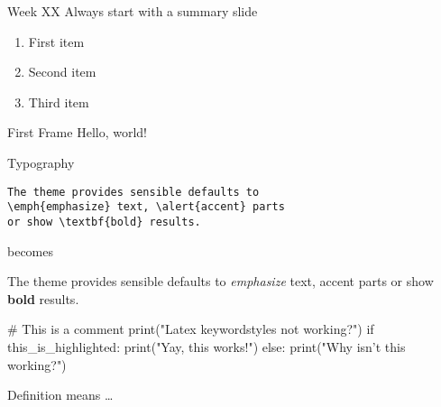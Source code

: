 \documentclass[aspectratio=169]{beamer}
\newcommand{\weekNumber}{XX}
\begin{document}
\maketitle

\begin{frame}{Week \weekNumber}
  Always start with a summary slide
  \begin{enumerate}
  \item First item
  \item Second item
  \item Third item
  \end{enumerate}
  \end{frame}

\begin{frame}{First Frame}
    Hello, world!
  \end{frame}

  \begin{frame}[fragile]{Typography}
      \begin{verbatim}The theme provides sensible defaults to
\emph{emphasize} text, \alert{accent} parts
or show \textbf{bold} results.\end{verbatim}

  \begin{center}becomes\end{center}

  The theme provides sensible defaults to \emph{emphasize} text,
  \alert{accent} parts or show \textbf{bold} results.
\end{frame}

  \begin{frame}[fragile]

  \begin{python}[caption={My\_Caption.py},firstnumber=10]
# This is a comment
print("Latex keywordstyles not working?")
if this_is_highlighted:
    print("Yay, this works!")
else:
    print("Why isn't this working?")
\end{python}
\end{frame}


\begin{frame}
\end{frame}

\begin{frame}
  Definition  means \dots
  \end{frame}
  
\end{document}
